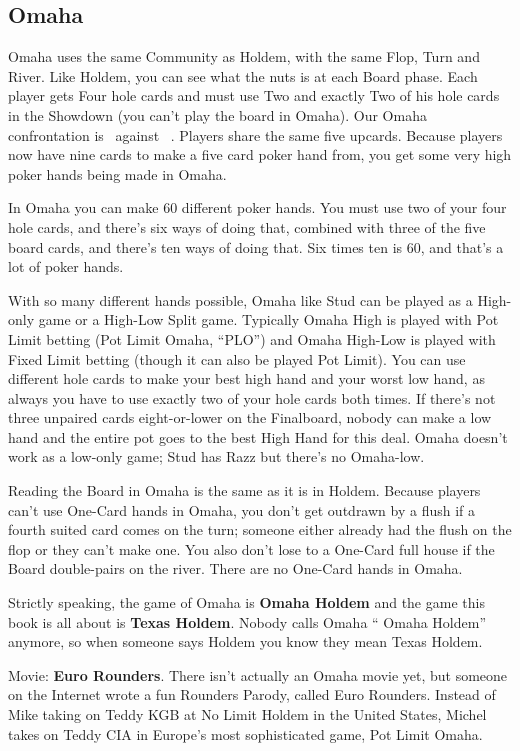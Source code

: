 \subsection{Omaha}

Omaha uses the same Community as
Holdem, with the same Flop, Turn and River. Like Holdem, you can see
what the nuts is at each Board phase. Each player gets Four hole
cards and must use Two and exactly Two of his hole cards in the
Showdown (you can't play the board in Omaha). Our Omaha confrontation
is 
\back\back\back\back\nines\Qd\Jd\tres\fourd\ against
\back\back\back\back\nines\Qd\Jd\tres\fourd\ . Players share the same five
upcards. Because players now have nine cards to make a five card poker
hand from, you get some very high poker hands being made in Omaha.

In Omaha you can make 60 different poker hands. You must use two of
your four hole cards, and there's six ways of doing that, combined
with three of the five board cards, and there's ten ways of doing
that. Six times ten is 60, and that's a lot of poker hands.

With so many different hands possible, Omaha like Stud can be played
as a High-only game or a High-Low Split game. Typically Omaha High is
played with Pot Limit betting (Pot Limit Omaha, ``PLO'') and Omaha
High-Low is played with Fixed Limit betting (though it can also be played
Pot Limit). You can use different hole cards to make your best high
hand and your worst low hand, as always you have to use exactly two of
your hole cards both times. If there's not three unpaired cards
eight-or-lower on the Finalboard, nobody can make a low hand and the
entire pot goes to the best High Hand for this deal. Omaha doesn't
work as a low-only game; Stud has Razz but there's no Omaha-low.

Reading the Board in Omaha is the same as it is in Holdem. Because
players can't use One-Card hands in Omaha, you don't get outdrawn
by a flush if a fourth suited card comes on the turn; someone either
already had the flush on the flop or they can't make one. You also
don't lose to a One-Card full house if the Board double-pairs on
the river. There are no One-Card hands in Omaha.

Strictly speaking, the game of Omaha is \textbf{Omaha Holdem} and the
game this book is all about is \textbf{Texas Holdem}. Nobody calls
Omaha `` Omaha Holdem'' anymore, so when someone says Holdem you know
they mean Texas Holdem.

Movie: \textbf{Euro Rounders}. There isn't actually an Omaha movie
yet, but someone on the Internet wrote a fun Rounders Parody, called
Euro Rounders. Instead of Mike taking on Teddy KGB at No Limit Holdem
in the United States, Michel takes on Teddy CIA in Europe's most
sophisticated game, Pot Limit Omaha.

